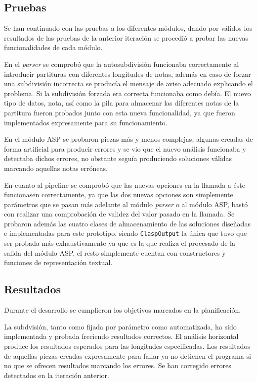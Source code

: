 \subsection{Pruebas}
\label{subsec:third_iteration_test}
Se han continuado con las pruebas a los diferentes módulos, dando por válidos los resultados de las pruebas de la anterior iteración se procedió a probar las nuevas funcionalidades de cada módulo.

En el \textit{parser} se comprobó que la autosubdivisión funcionaba correctamente al introducir partituras con diferentes longitudes de notas, además en caso de forzar una subdivisión incorrecta se producía el mensaje de aviso adecuado explicando el problema. Si la subdivisión forzada era correcta funcionaba como debía. El nuevo tipo de datos, nota, así como la pila para almacenar las diferentes notas de la partitura fueron probados junto con esta nueva funcionalidad, ya que fueron implementados expresamente para su funcionamiento.

En el módulo ASP se probaron piezas más y menos complejas, algunas creadas de forma artificial para producir errores y se vio que el nuevo análisis funcionaba y detectaba dichos errores, no obstante seguía produciendo soluciones válidas marcando aquellas notas erróneas.

En cuanto al pipeline se comprobó que las nuevas opciones en la llamada a éste funcionasen correctamente, ya que las dos nuevas opciones son simplemente parámetros que se pasan más adelante al módulo \textit{parser} o al módulo ASP, bastó con realizar una comprobación de validez del valor pasado en la llamada. Se probaron además las cuatro clases de almacenamiento de las soluciones diseñadas e implementadas para este prototipo, siendo \texttt{ClaspOutput} la única que tuvo que ser probada más exhaustivamente ya que es la que realiza el procesado de la salida del módulo ASP, el resto simplemente cuentan con constructores y funciones de representación textual. 

\subsection{Resultados}
\label{subsec:third_iteration_result}
Durante el desarrollo se cumplieron los objetivos marcados en la planificación.

La subdvisión, tanto como fijada por parámetro como automatizada, ha sido implementada y probada freciendo resultados correctos. El análisis horizontal produce los resultados esperados para las longitudes especificadas. Los resultados de aquellas piezas creadas expresamente para fallar ya no detienen el programa si no que se ofrecen resultados marcando los errores. Se han corregido errores detectados en la iteración anterior.

